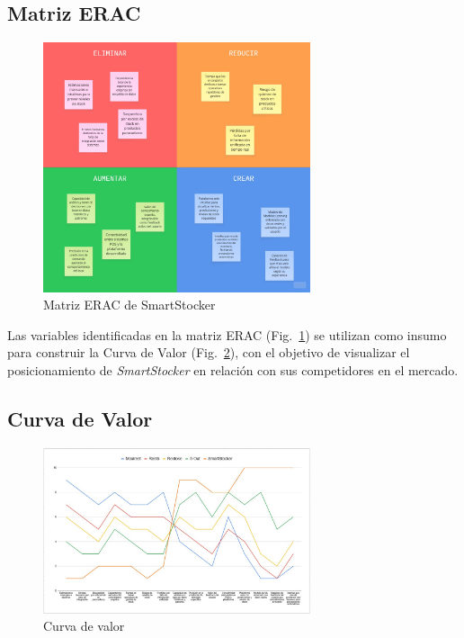 \subsection{Matriz ERAC}\label{sec:erac}

\begin{figure}[htbp]
    \centering
    \includegraphics[width=0.7\textwidth]{images/matrizEric.jpeg}
    \caption{Matriz ERAC de SmartStocker}
    \label{fig:eric}
\end{figure}

Las variables identificadas en la matriz ERAC (Fig.~\ref{fig:eric}) se utilizan como insumo para construir la Curva de Valor (Fig.~\ref{fig:curva}), con el objetivo de visualizar el posicionamiento de \emph{SmartStocker} en relación con sus competidores en el mercado.

\FloatBarrier

\clearpage
\subsection{Curva de Valor}\label{sec:curva-valor}

\begin{figure}[htbp]
    \centering
    \includegraphics[width=0.7\textwidth]{images/curvaValor.jpeg}
    \caption{Curva de valor}
    \label{fig:curva}
\end{figure}


